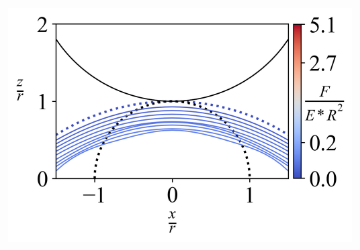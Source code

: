 \begin{figure}[H]
\begin{subfigure}{0.32\textwidth}
        \includegraphics[width=1\linewidth]{Figures/Hemisphere-LineContour-9.png}
    \end{subfigure} 
    
    \vspace{-0.1in}
    
    \caption{\label{fig: All-Hemisphere-ContourPlot} }
\end{figure}









